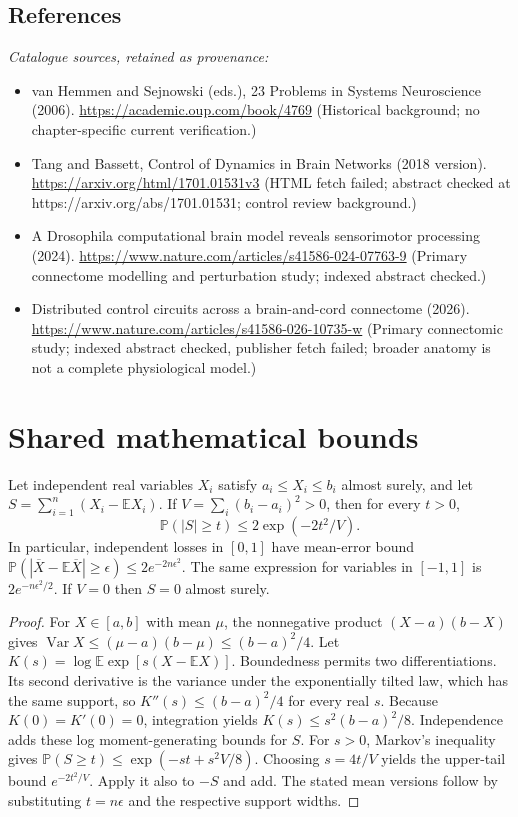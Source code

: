 \documentclass[11pt]{article}
\begin{document}
\subsection{References}
\noindent\emph{Catalogue sources, retained as provenance:}
\begin{itemize}
\item van Hemmen and Sejnowski (eds.), 23 Problems in Systems Neuroscience (2006). \url{https://academic.oup.com/book/4769} (Historical background; no chapter-specific current verification.)
\item Tang and Bassett, Control of Dynamics in Brain Networks (2018 version). \url{https://arxiv.org/html/1701.01531v3} (HTML fetch failed; abstract checked at https://arxiv.org/abs/1701.01531; control review background.)
\item A Drosophila computational brain model reveals sensorimotor processing (2024). \url{https://www.nature.com/articles/s41586-024-07763-9} (Primary connectome modelling and perturbation study; indexed abstract checked.)
\item Distributed control circuits across a brain-and-cord connectome (2026). \url{https://www.nature.com/articles/s41586-026-10735-w} (Primary connectomic study; indexed abstract checked, publisher fetch failed; broader anatomy is not a complete physiological model.)
\end{itemize}




\section{Shared mathematical bounds}\label{app:bounds}
\begin{lemma}\label{lem:bounded}
Let independent real variables $X_i$ satisfy $a_i\leq X_i\leq b_i$ almost surely,
and let $S=\sum_{i=1}^n(X_i-\mathbb{E} X_i)$. If
$V=\sum_i(b_i-a_i)^2>0$, then for every $t>0$,
\[
 \mathbb{P}(|S|\geq t)\leq 2\exp(-2t^2/V).
\]
In particular, independent losses in $[0,1]$ have mean-error bound
$\mathbb{P}(|\overline X-\mathbb{E}\overline X|\geq\epsilon)
\leq2e^{-2n\epsilon^2}$. The same expression for variables in $[-1,1]$
is $2e^{-n\epsilon^2/2}$. If $V=0$ then $S=0$ almost surely.
\end{lemma}
\begin{proof}
For $X\in[a,b]$ with mean $\mu$, the nonnegative product
$(X-a)(b-X)$ gives
$\operatorname{Var} X\leq(\mu-a)(b-\mu)\leq(b-a)^2/4$.
Let $K(s)=\log\mathbb{E}\exp[s(X-\mathbb{E} X)]$.
Boundedness permits two differentiations. Its second derivative is the variance
under the exponentially tilted law, which has the same support, so
$K''(s)\leq(b-a)^2/4$ for every real $s$.
Because $K(0)=K'(0)=0$, integration yields
$K(s)\leq s^2(b-a)^2/8$.
Independence adds these log moment-generating bounds for $S$.
For $s>0$, Markov's inequality gives
$\mathbb{P}(S\geq t)\leq\exp(-st+s^2V/8)$.
Choosing $s=4t/V$ yields the upper-tail bound $e^{-2t^2/V}$.
Apply it also to $-S$ and add. The stated mean versions follow by substituting
$t=n\epsilon$ and the respective support widths.
\end{proof}
\end{document}
